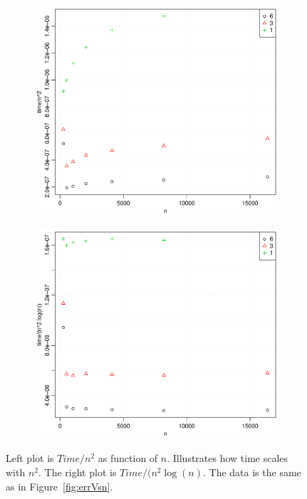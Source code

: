 \begin{figure}[h!]
  \centering
  \begin{subfigure}[b]{0.48\textwidth}
    \includegraphics[width=\textwidth]{./Figures/timeOverN2Vsn.pdf}
  \end{subfigure}%
  \quad
  \begin{subfigure}[b]{0.48\textwidth}
    \includegraphics[width=\textwidth]{./Figures/timeOverN2LogNVsn.pdf}
  \end{subfigure}
  \vspace{-0.1\baselineskip}
  \caption{Left plot is $Time/n^2$ as function of $n$. Illustrates how time scales with $n^2$. The right plot is $Time/(n^2 \log (n)$. The data is the same as in Figure~\ref{fig:errVsn}.}
  \label{fig:timeVsn}
\end{figure}
\\
